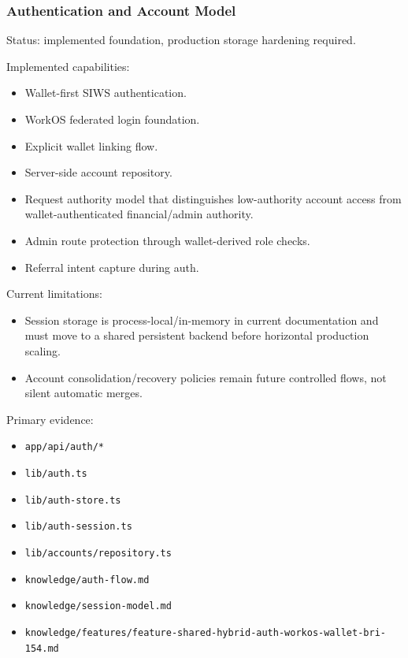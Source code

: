 \documentclass[
  10pt,
  letterpaper,
]{article}
\providecommand{\tightlist}{%
  \setlength{\itemsep}{0pt}\setlength{\parskip}{0pt}}
\let\oldtexttt\texttt
\renewcommand{\texttt}[1]{\oldtexttt{\small #1}}
\begin{document}
\subsubsection{Authentication and Account
Model}\label{authentication-and-account-model}

Status: implemented foundation, production storage hardening required.

Implemented capabilities:

\begin{itemize}
\tightlist
\item
  Wallet-first SIWS authentication.
\item
  WorkOS federated login foundation.
\item
  Explicit wallet linking flow.
\item
  Server-side account repository.
\item
  Request authority model that distinguishes low-authority account
  access from wallet-authenticated financial/admin authority.
\item
  Admin route protection through wallet-derived role checks.
\item
  Referral intent capture during auth.
\end{itemize}

Current limitations:

\begin{itemize}
\tightlist
\item
  Session storage is process-local/in-memory in current documentation
  and must move to a shared persistent backend before horizontal
  production scaling.
\item
  Account consolidation/recovery policies remain future controlled
  flows, not silent automatic merges.
\end{itemize}

Primary evidence:

\begin{itemize}
\tightlist
\item
  \texttt{app/api/auth/*}
\item
  \texttt{lib/auth.ts}
\item
  \texttt{lib/auth-store.ts}
\item
  \texttt{lib/auth-session.ts}
\item
  \texttt{lib/accounts/repository.ts}
\item
  \texttt{knowledge/auth-flow.md}
\item
  \texttt{knowledge/session-model.md}
\item
  \texttt{knowledge/features/feature-shared-hybrid-auth-workos-wallet-bri-154.md}
\end{itemize}
\end{document}
